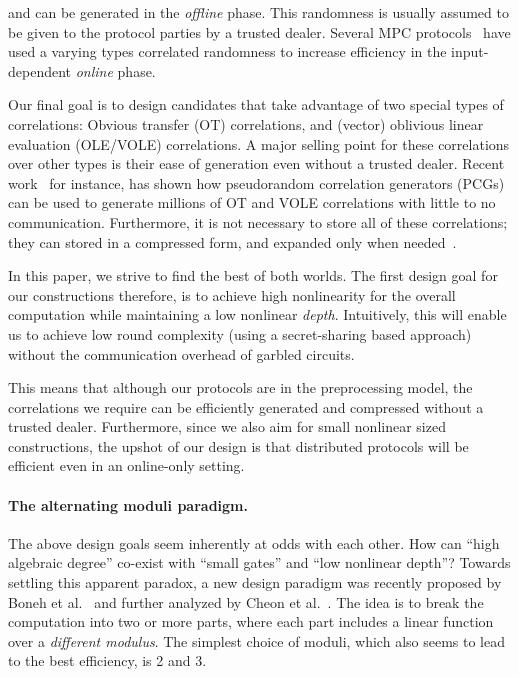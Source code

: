     and can be generated in the \textit{offline} phase. This randomness is usually assumed to be given to the protocol parties by a trusted dealer. Several MPC protocols~\cite{?} have used a varying types correlated randomness to increase efficiency in the input-dependent \textit{online} phase.

    \hspace*{1em} Our final goal is to design candidates that take advantage of two special types of correlations: Obvious transfer (OT) correlations, and (vector) oblivious linear evaluation (OLE/VOLE) correlations. A major selling point for these correlations over other types is their ease of generation even without a trusted dealer. Recent work~\cite{?} for instance, has shown how pseudorandom correlation generators (PCGs) can be used to generate millions of OT and VOLE correlations with little to no communication. Furthermore, it is not necessary to store all of these correlations; they can stored in a compressed form, and expanded only when needed~\cite{?}.


    \hspace*{1em} In this paper, we strive to find the best of both worlds. The first design goal for our constructions therefore, is to achieve high nonlinearity for the overall computation while maintaining a low nonlinear \textit{depth}. Intuitively, this will enable us to achieve low round complexity (using a secret-sharing based approach) without the communication overhead of garbled circuits.

    \hspace*{1em} This means that although our protocols are in the preprocessing model, the correlations we require can be efficiently generated and compressed without a trusted dealer. Furthermore, since we also aim for small nonlinear sized constructions, the upshot of our design is that distributed protocols will be efficient even in an online-only setting. 
\fi

\paragraph{\bf The alternating moduli paradigm.} The above design goals seem inherently at odds with each other. How can ``high algebraic degree'' co-exist with ``small gates'' and ``low nonlinear depth''? Towards settling this apparent paradox, a new design paradigm was recently proposed by Boneh et al.~\cite{boneh2018-darkmatter} and further analyzed by Cheon et al.~\cite{cheon2020-adventures}. The idea is to break the computation into two or more parts, where each part includes a linear function over a {\em different modulus}. The simplest choice of moduli, which also seems to lead to the best efficiency, is 2 and 3. 

